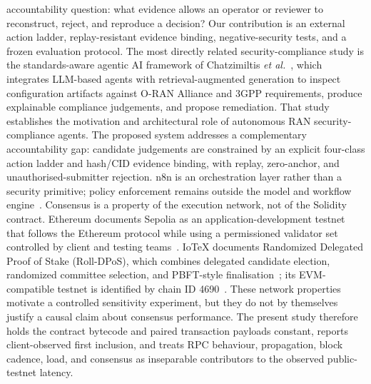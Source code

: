 \documentclass[journal]{IEEEtran}
\begin{document}
accountability question: what evidence allows an operator or reviewer to
reconstruct, reject, and reproduce a decision? Our contribution is an
external action ladder, replay-resistant evidence binding, negative-security
tests, and a frozen evaluation protocol.
The most directly related security-compliance study is the standards-aware
agentic AI framework of Chatzimiltis \emph{et al.}~\cite{chatzimiltis2026},
which integrates LLM-based agents with retrieval-augmented generation to
inspect configuration artifacts against O-RAN Alliance and 3GPP requirements,
produce explainable compliance judgements, and propose remediation. That study
establishes the motivation and architectural role of autonomous RAN
security-compliance agents. The proposed system addresses a complementary
accountability gap: candidate judgements are constrained by an explicit
four-class action ladder and hash/CID evidence binding, with replay,
zero-anchor, and unauthorised-submitter rejection. n8n is an orchestration
layer rather than a security primitive; policy enforcement remains outside
the model and workflow engine~\cite{n8nDocs}.
Consensus is a property of the execution network, not of the Solidity
contract. Ethereum documents Sepolia as an application-development testnet
that follows the Ethereum protocol while using a permissioned validator set
controlled by client and testing teams~\cite{ethereumNetworks}. IoTeX
documents Randomized Delegated Proof of Stake (Roll-DPoS), which combines
delegated candidate election, randomized committee selection, and PBFT-style
finalisation~\cite{iotexRollDpos}; its EVM-compatible testnet is identified by
chain ID 4690~\cite{iotexRpc}. These network properties motivate a controlled
sensitivity experiment, but they do not by themselves justify a causal claim
about consensus performance. The present study therefore holds the contract
bytecode and paired transaction payloads constant, reports client-observed
first inclusion, and treats RPC behaviour, propagation, block cadence, load,
and consensus as inseparable contributors to the observed public-testnet
latency.
\end{document}
